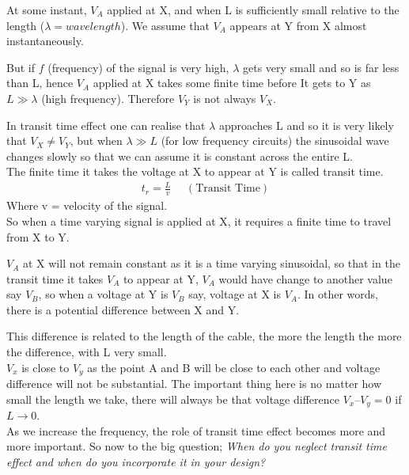 	At some instant, $ V_{A} $ applied at X, and when L is sufficiently small relative to the length ($  \lambda = wavelength $). We assume that $ V_{A} $ appears at Y from X almost instantaneously.
	
	But if $f$ (frequency) of the signal is very high, $\lambda $ gets very small and so is far less than L, hence  $  V_{A} $ applied at X takes some finite time before It gets to Y as $  L\gg \lambda $ (high frequency). Therefore $  V_{Y} $ is not always $  V_{X} $.

	In transit time effect one can realise that $ \lambda $  approaches L and so it is very likely that $ V_{X} \neq V_{Y} $, but when $  \lambda \gg L  $ (for low frequency circuits) the sinusoidal wave changes slowly so that we can assume it is constant across the entire L.\\
	The finite time it takes the voltage at X to appear at Y is called transit time.
	\begin{align}
	 t_{r} = \frac{L}{v}\ \ \ \ \ \ (\text{Transit  Time})
	\end{align}
	 Where v = velocity of the signal.\\
	 
	So when a time varying signal is applied at X, it requires a finite time to travel from X to Y. 
	
	$ V_{A} $  at X will not remain constant as it is a time varying sinusoidal, so that in the transit time it takes $ V_{A} $ to appear at Y, $ V_{A} $ would have change to another value say $ V_{B} $, so when a voltage at Y is $ V_{B} $ say, voltage at X is $ V_{A} $. In other words, there is a potential difference between X and Y.
	
	This difference is related to the length of the cable, the more the length the more the difference, with L very small.
	\\
	
	$ V_{x} $ is close to $ V_{y} $ as the point A and B will be close to each other and voltage difference will not be substantial. The important thing here is no matter how small the length we take, there will always be that voltage difference $ V_{x} – V_{y} = 0 $ if $ L \rightarrow 0 $. \\
	
	As we increase the frequency, the role of transit time effect becomes more and more important.
	So now to the big question; \textit{When do you neglect transit time effect and when do you incorporate it in your design?}\\
	
